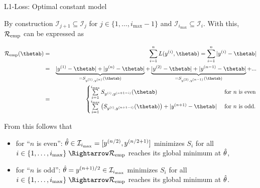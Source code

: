 \begin{vbframe}{L1-Loss: Optimal constant model}
\begin{itemize}
  By construction $\mathcal{I}_{j+1} \subseteq \mathcal{I}_j$ for $j \in \{1,\dots,i_{\max}-1\}$ and $\mathcal{I}_{i_{\max}} \subseteq \mathcal{I}_i$. With this, $\mathcal{R}_{\text{emp}}$ can be expressed as
  \begin{footnotesize}
  \begin{eqnarray*}
  \riske(\thetab) &=& \sumin L(\yi,\thetab) = \sumin|\yi - \thetab| \\ 
  &=& \underbrace{|\yi[1] - \thetab| + |\yi[n] - \thetab|}_{= S_{\yi[1], \yi[n]}(\thetab)} + \underbrace{|\yi[2] - \thetab| + |\yi[n - 1] - \thetab|}_{= S_{\yi[2], \yi[n - 1]}(\thetab)} + ...  \\
  &=& \begin{cases} \sum\limits_{i = 1}^{i_{\max}} S_{\yi, \yi[n + 1 - i]}(\thetab) & \text{ for } n \text{ is even} \\
  \sum\limits_{i = 1}^{i_{\max}} \left(S_{\yi, \yi[n + 1 - i]}(\thetab)\right) + |\yi[n + 1] - \thetab| & \text{ for } n \text{ is odd}. \end{cases}
  \end{eqnarray*}
  \end{footnotesize}

  \framebreak 

  From this follows that
  \begin{itemize}
  \item for \enquote{$n$ is even}: $\hat{\theta} \in  \mathcal{I}_{i_{\max}} = [y^{(n/2)},y^{(n/2+1)}]$ minimizes $S_i$ for all $i \in \{1,\dots, i_{\max}\} \; \Rightarrow  \riske$ reaches its global minimum at $\hat{\theta}$,
  \item for \enquote{$n$ is odd}: $\hat{\theta} = y^{(n+1)/2} \in \mathcal{I}_{i_{\max}}$ minimizes $S_i$ for all $i \in \{1,\dots, i_{\max}\} \; \Rightarrow  \riske$ reaches its global minimum at $\hat{\theta}$.
  \end{itemize}


\end{itemize}
\end{vbframe}
